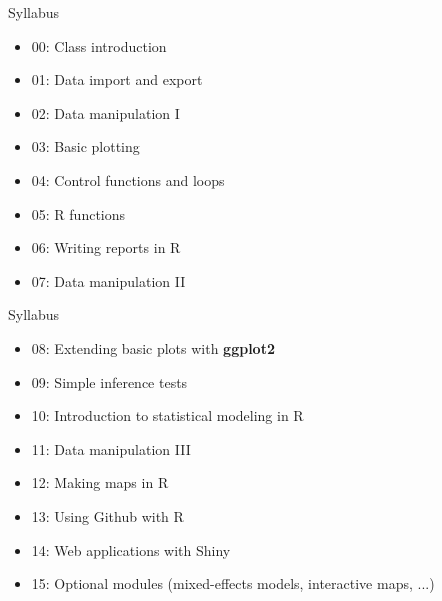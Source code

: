 \documentclass[aspectratio=169]{beamer}\usepackage[]{graphicx}\usepackage[]{color}
\begin{document}
\begin{frame}{Syllabus}
\begin{itemize}
  \item 00: Class introduction
  \item 01: Data import and export
  \item 02: Data manipulation I
  \item 03: Basic plotting
  \item 04: Control functions and loops
  \item 05: R functions
  \item 06: Writing reports in R
  \item 07: Data manipulation II
\end{itemize}
\end{frame}

\begin{frame}{Syllabus}
\begin{itemize}
  \item 08: Extending basic plots with \textbf{ggplot2}
  \item 09: Simple inference tests
  \item 10: Introduction to statistical modeling in R
  \item 11: Data manipulation III
  \item 12: Making maps in R
  \item 13: Using Github with R
  \item 14: Web applications with Shiny
  \item 15: Optional modules (mixed-effects models, interactive maps, ...)
\end{itemize}
\end{frame}
\end{document}
